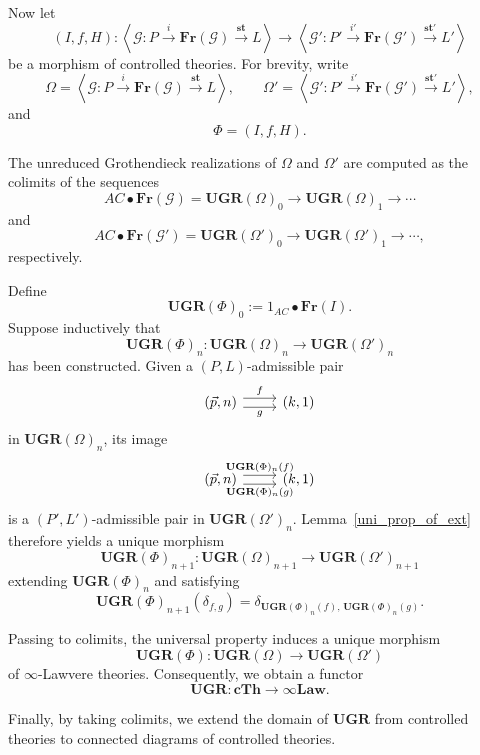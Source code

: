 \documentclass{tac}
\begin{document}
Now let
\[
(I,f,H):
\left\langle
\mathcal{G}:P\xrightarrow{i}\mathbf{Fr}(\mathcal{G})
\xrightarrow{\mathbf{st}}L
\right\rangle
\longrightarrow
\left\langle
\mathcal{G}':P'\xrightarrow{i'}\mathbf{Fr}(\mathcal{G}')
\xrightarrow{\mathbf{st}'}L'
\right\rangle
\]
be a morphism of controlled theories. For brevity, write
\[
\Omega=
\left\langle
\mathcal{G}:P\xrightarrow{i}\mathbf{Fr}(\mathcal{G})
\xrightarrow{\mathbf{st}}L
\right\rangle,
\qquad
\Omega'=
\left\langle
\mathcal{G}':P'\xrightarrow{i'}\mathbf{Fr}(\mathcal{G}')
\xrightarrow{\mathbf{st}'}L'
\right\rangle,
\]
and
\[
\Phi=(I,f,H).
\]

The unreduced Grothendieck realizations of $\Omega$ and $\Omega'$ are computed as the colimits of the sequences
\[
AC\bullet\mathbf{Fr}(\mathcal{G})=\mathbf{UGR}(\Omega)_0\to \mathbf{UGR}(\Omega)_1\to\cdots
\]
and
\[
AC\bullet\mathbf{Fr}(\mathcal{G}')=\mathbf{UGR}(\Omega')_0\to \mathbf{UGR}(\Omega')_1\to\cdots,
\]
respectively.

Define
\[
\mathbf{UGR}(\Phi)_0:=1_{AC}\bullet\mathbf{Fr}(I).
\]
Suppose inductively that
\[
\mathbf{UGR}(\Phi)_n:
\mathbf{UGR}(\Omega)_n
\longrightarrow
\mathbf{UGR}(\Omega')_n
\]
has been constructed. Given a $(P,L)$-admissible pair
\[
\begin{tikzcd}
	(\vec{p},n)\ar[r,shift left=.75ex,"f"]
	\ar[r,shift right=.75ex,swap,"g"]&
	(k,1)
\end{tikzcd}
\]
in $\mathbf{UGR}(\Omega)_n$, its image
\[
\begin{tikzcd}
	(\vec{p},n)\ar[r,shift left=.75ex,"\mathbf{UGR}(\Phi)_n(f)"]
	\ar[r,shift right=.75ex,swap,"\mathbf{UGR}(\Phi)_n(g)"]&
	(k,1)
\end{tikzcd}
\]
is a $(P',L')$-admissible pair in $\mathbf{UGR}(\Omega')_n$. Lemma~\ref{uni_prop_of_ext} therefore yields a unique morphism
\[
\mathbf{UGR}(\Phi)_{n+1}:
\mathbf{UGR}(\Omega)_{n+1}
\longrightarrow
\mathbf{UGR}(\Omega')_{n+1}
\]
extending $\mathbf{UGR}(\Phi)_n$ and satisfying
\[
\mathbf{UGR}(\Phi)_{n+1}(\delta_{f,g})=\delta_{\mathbf{UGR}(\Phi)_n(f),\,\mathbf{UGR}(\Phi)_n(g)}.
\]

Passing to colimits, the universal property induces a unique morphism
\[
\mathbf{UGR}(\Phi):
\mathbf{UGR}(\Omega)
\longrightarrow
\mathbf{UGR}(\Omega')
\]
of $\infty$-Lawvere theories. Consequently, we obtain a functor
\[
\mathbf{UGR}:\mathbf{cTh}\longrightarrow\infty\mathbf{Law}.
\]

Finally, by taking colimits, we extend the domain of $\mathbf{UGR}$ from controlled theories to connected diagrams of controlled theories.
\end{document}
